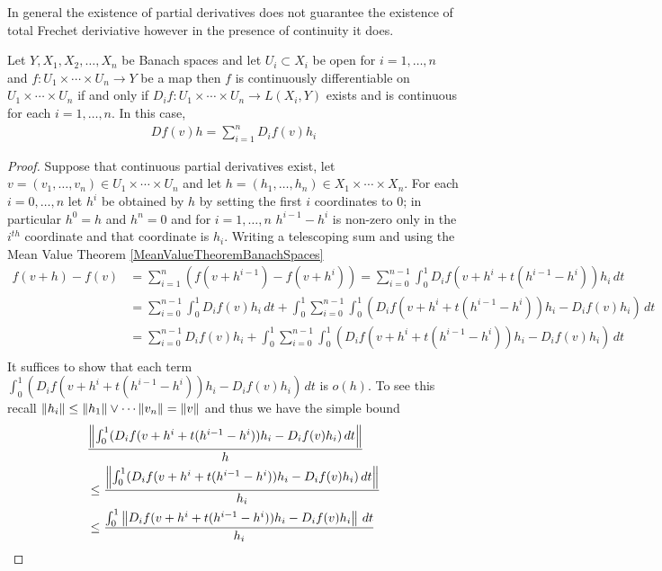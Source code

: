 In general the existence of partial derivatives does not guarantee the existence of total Frechet deriviative however in the presence of continuity it does.
\begin{prop}\label{PartialDerivativesBanachSpaces}Let $Y,X_1, X_2, \dotsc, X_n$ be Banach spaces and let $U_i \subset X_i$ be open for $i=1, \dotsc, n$ and $f : U_1 \times \dotsb \times U_n \to Y$ be a map then $f$ is continuously differentiable on $U_1 \times \dotsb \times U_n$ if and only if $D_i f : U_1 \times \dotsb \times U_n \to L(X_i,Y)$ exists and is continuous for each $i=1, \dotsc,n$.
In this case,
\begin{align*}
D f (v) h = \sum_{i=1}^n D_i f( v) h_i
\end{align*}
\end{prop}
\begin{proof}
Suppose that continuous partial derivatives exist, let $v=(v_1, \dotsc, v_n) \in U_1 \times \dotsb \times U_n$ and let $h=(h_1, \dotsc, h_n) \in X_1 \times \dotsb \times X_n$.  
For each $i=0, \dotsc, n$ let $h^i$ be obtained by $h$ by setting the first $i$ coordinates to $0$; in particular $h^0=h$ and $h^n=0$ and for $i=1, \dotsc, n$ $h^{i-1}-h^{i}$ is non-zero only in the $i^{th}$ coordinate and that coordinate is $h_i$.
Writing a telescoping sum and using the Mean Value Theorem \ref{MeanValueTheoremBanachSpaces}
\begin{align*}
f(v + h) - f(v) &= \sum_{i=1}^{n} (f(v + h^{i-1}) - f(v+h^{i})) = \sum_{i=0}^{n-1} \int_0^1 D_i f(v+h^i + t(h^{i-1}-h^i)) h_i \, dt \\
&=\sum_{i=0}^{n-1} \int_0^1 D_i f (v) h_i \, dt + \int_0^1 \sum_{i=0}^{n-1} \int_0^1 (D_i f(v+h^i + t(h^{i-1}-h^i)) h_i - D_i f (v) h_i )\, dt \\
&=\sum_{i=0}^{n-1} D_i f (v) h_i + \int_0^1 \sum_{i=0}^{n-1} \int_0^1 (D_i f(v+h^i + t(h^{i-1}-h^i)) h_i - D_i f (v) h_i )\, dt \\
\end{align*}
It suffices to show that each term $\int_0^1 (D_i f(v+h^i + t(h^{i-1}-h^i)) h_i - D_i f (v) h_i )\, dt$ is $o(h)$.  To see this recall $\left \lVert h_i \right \rVert \leq \left \lVert h_1 \right \rVert \vee \dotsb \left \lVert v_n \right \rVert = \left \lVert v \right \rVert$ and thus we have the simple bound
\begin{align*}
&\frac{\norm {\int_0^1 (D_i f(v+h^i + t(h^{i-1}-h^i)) h_i - D_i f (v) h_i )\, dt}}{h} \\
&\leq \frac{\norm {\int_0^1 (D_i f(v+h^i + t(h^{i-1}-h^i)) h_i - D_i f (v) h_i )\, dt}}{h_i} \\
&\leq \frac{\int_0^1 \norm { D_i f(v+h^i + t(h^{i-1}-h^i)) h_i - D_i f (v) h_i }\, dt}{h_i} \\

\end{align*}
\end{proof}
